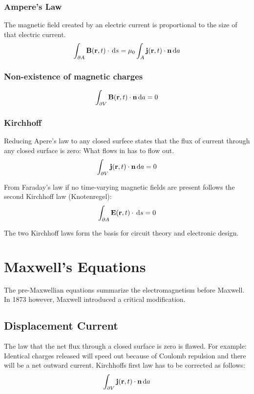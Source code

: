 \documentclass[a4paper, fontsize=8pt, landscape, DIV=1]{scrartcl}
\begin{document}
\begin{multicols*}{4}
  \subsubsection{Ampere's Law}
  The magnetic field created by an electric current is proportional to the size of that electric current.
  \[\int_{\partial A}\mathbf{B}(\mathbf{r},t)\cdot \,\mathrm{d} s = \mu_0 \int_A \mathbf{j}(\mathbf{r},t)\cdot \mathbf{n} \,\mathrm{d} a \]

  \subsubsection{Non-existence of magnetic charges}

  \[\int_{\partial V}\mathbf{B}(\mathbf{r},t)\cdot \mathbf{n} \,\mathrm{d} a = 0 \]
  
  \subsubsection{Kirchhoff}
  Reducing Apere's law to any closed surfece states that the flux of current through any closed surface is zero: What flows in has to flow out.
  \[ \int_{\partial V} \mathbf{j}(\mathbf{r},t) \cdot \mathbf{n}\,\mathrm{d} a = 0 \]

  From Faraday's law if no time-varying magnetic fields are present follows the second Kirchhoff law (Knotenregel):
  \[ \int_{\partial A} \mathbf{E}(\mathbf{r},t)\cdot \,\mathrm{d} s = 0 \]

  The two Kirchhoff laws form the basis for circuit theory and electronic design.

  \section{Maxwell's Equations}
  The pre-Maxwellian equations summarize the electromagnetism before Maxwell. In 1873 however, Maxwell introduced a critical modification.

  \subsection{Displacement Current}
  The law that the net flux through a closed surface is zero is flawed. For example: Identical charges released will speed out because of Coulomb repulsion and there will be a net outward current. Kirchhoffs first law has to be corrected as follows:
  \[\int_{\partial V} \mathbf{j}(\mathbf{r},t) \cdot \mathbf{n} \,\mathrm{d} a\]


\end{multicols*}
\end{document}
